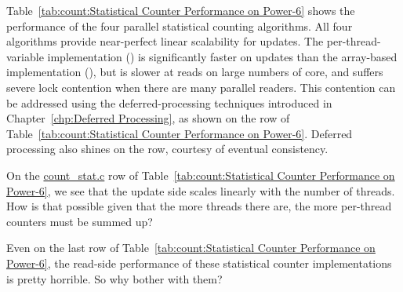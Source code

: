 Table~\ref{tab:count:Statistical Counter Performance on Power-6}
shows the performance of the four parallel statistical counting
algorithms.
All four algorithms provide near-perfect linear scalability for updates.
The per-thread-variable implementation ()
is significantly faster on
updates than the array-based implementation
(), but is slower at reads on large numbers of core,
and suffers severe lock contention when there are many parallel readers.
This contention can be addressed using the deferred-processing
techniques introduced in
Chapter~\ref{chp:Deferred Processing},
as shown on the  row of
Table~\ref{tab:count:Statistical Counter Performance on Power-6}.
Deferred processing also shines on the  row,
courtesy of eventual consistency.

\QuickQuiz{}
	On the \url{count_stat.c} row of
	Table~\ref{tab:count:Statistical Counter Performance on Power-6},
	we see that the update side scales linearly with the number of
	threads.
	How is that possible given that the more threads there are,
	the more per-thread counters must be summed up?
 \QuickQuizEnd

\QuickQuiz{}
	Even on the last row of
	Table~\ref{tab:count:Statistical Counter Performance on Power-6},
	the read-side performance of these statistical counter
	implementations is pretty horrible.
	So why bother with them?
 \QuickQuizEnd

